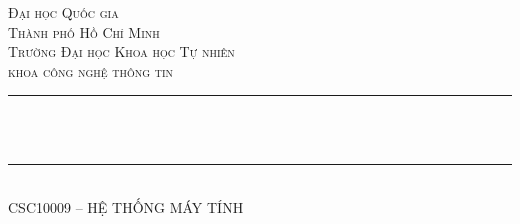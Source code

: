 \thispagestyle{empty}
\begin{titlepage}
	\begin{center}
		\makeatletter
		\newcommand{\HRule}{\rule{\linewidth}{0.4mm}}

		\textsc{\LARGE Đại học Quốc gia\\Thành phố Hồ Chí Minh}\\[1.5cm]
		\textsc{\Large Trường Đại học Khoa học Tự nhiên}\\[0.5cm]
		\textsc{\Large khoa công nghệ thông tin}\\[1.5cm]

		{\HRule}\\[1cm]
		{\huge \bfseries \@title}\\[0.5cm]
		{\HRule}\\[2cm]

		\textsc{\large CSC10009 -- HỆ THỐNG MÁY TÍNH}\\[0.5cm]

		\vfill\vfill\vfill

		{\large \@author}\\[1.5cm]
		{\large \@date}
		\makeatother
	\end{center}
\end{titlepage}